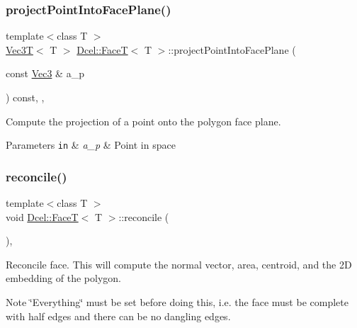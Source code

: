 \subsubsection{\texorpdfstring{project\+Point\+Into\+Face\+Plane()}{projectPointIntoFacePlane()}}
{\footnotesize\ttfamily template$<$class T $>$ \\
\hyperlink{classVec3T}{Vec3T}$<$ T $>$ \hyperlink{classDcel_1_1FaceT}{Dcel\+::\+FaceT}$<$ T $>$\+::project\+Point\+Into\+Face\+Plane (\begin{DoxyParamCaption}\item[{const \hyperlink{classDcel_1_1FaceT_ade9c182834ec6f18a0e17b8140308db2}{Vec3} \&}]{a\+\_\+p }\end{DoxyParamCaption}) const\hspace{0.3cm}{\ttfamily [inline]}, {\ttfamily [protected]}, {\ttfamily [noexcept]}}



Compute the projection of a point onto the polygon face plane. 


\begin{DoxyParams}[1]{Parameters}
\mbox{\tt in}  & {\em a\+\_\+p} & Point in space \\
\hline
\end{DoxyParams}
\mbox{\label{classDcel_1_1FaceT_aaf3f8b92ca4393391ea213b0ecfe19bd}} 
\subsubsection{\texorpdfstring{reconcile()}{reconcile()}}
{\footnotesize\ttfamily template$<$class T $>$ \\
void \hyperlink{classDcel_1_1FaceT}{Dcel\+::\+FaceT}$<$ T $>$\+::reconcile (\begin{DoxyParamCaption}{ }\end{DoxyParamCaption})\hspace{0.3cm}{\ttfamily [inline]}, {\ttfamily [noexcept]}}



Reconcile face. This will compute the normal vector, area, centroid, and the 2D embedding of the polygon. 

\begin{DoxyNote}{Note}
\char`\"{}\+Everything\char`\"{} must be set before doing this, i.\+e. the face must be complete with half edges and there can be no dangling edges. 
\end{DoxyNote}
\mbox{\label{classDcel_1_1FaceT_a2680477d0a6c8b2187230170522fe3a5}} 
